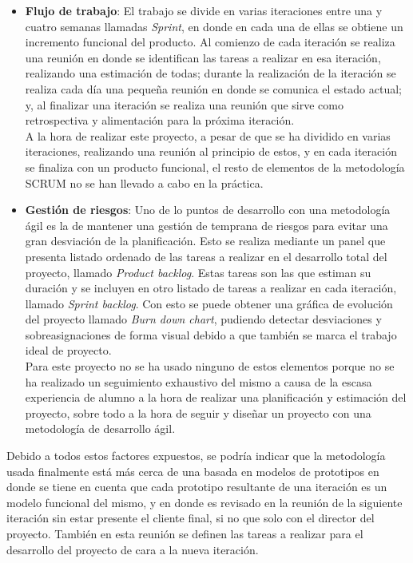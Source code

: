 \begin{itemize}
	\item \textbf{Flujo de trabajo}: El trabajo se divide en varias iteraciones entre una y cuatro semanas llamadas \textit{Sprint}, en donde en cada una de ellas se obtiene un incremento funcional del producto. Al comienzo de cada iteración se realiza una reunión en donde se identifican las tareas a realizar en esa iteración, realizando una estimación de todas; durante la realización de la iteración se realiza cada día una pequeña reunión en donde se comunica el estado actual; y, al finalizar una iteración se realiza una reunión que sirve como retrospectiva y alimentación para la próxima iteración. \\
	
	A la hora de realizar este proyecto, a pesar de que se ha dividido en varias iteraciones, realizando una reunión al principio de estos, y en cada iteración se finaliza con un producto funcional, el resto de elementos de la metodología SCRUM no se han llevado a cabo en la práctica.
	
	\item \textbf{Gestión de riesgos}: Uno de lo puntos de desarrollo con una metodología ágil es la de mantener una gestión de temprana de riesgos para evitar una gran desviación de la planificación. Esto se realiza mediante un panel que presenta listado ordenado de las tareas a realizar en el desarrollo total del proyecto, llamado \textit{Product backlog}. Estas tareas son las que estiman su duración y se incluyen en otro listado de tareas a realizar en cada iteración, llamado \textit{Sprint backlog}. Con esto se puede obtener una gráfica de evolución del proyecto llamado \textit{Burn down chart}, pudiendo detectar desviaciones y sobreasignaciones de forma visual debido a que también se marca el trabajo ideal de proyecto. \\
	
	Para este proyecto no se ha usado ninguno de estos elementos porque no se ha realizado un seguimiento exhaustivo del mismo a causa de la escasa experiencia de alumno a la hora de realizar una planificación y estimación del proyecto, sobre todo a la hora de seguir y diseñar un proyecto con una metodología de desarrollo ágil.
\end{itemize}

Debido a todos estos factores expuestos, se podría indicar que la metodología usada finalmente está más cerca de una basada en modelos de prototipos en donde se tiene en cuenta que cada prototipo resultante de una iteración es un modelo funcional del mismo, y en donde es revisado en la reunión de la siguiente iteración sin estar presente el cliente final, si no que solo con el director del proyecto. También en esta reunión se definen las tareas a realizar para el desarrollo del proyecto de cara a la nueva iteración. \\

